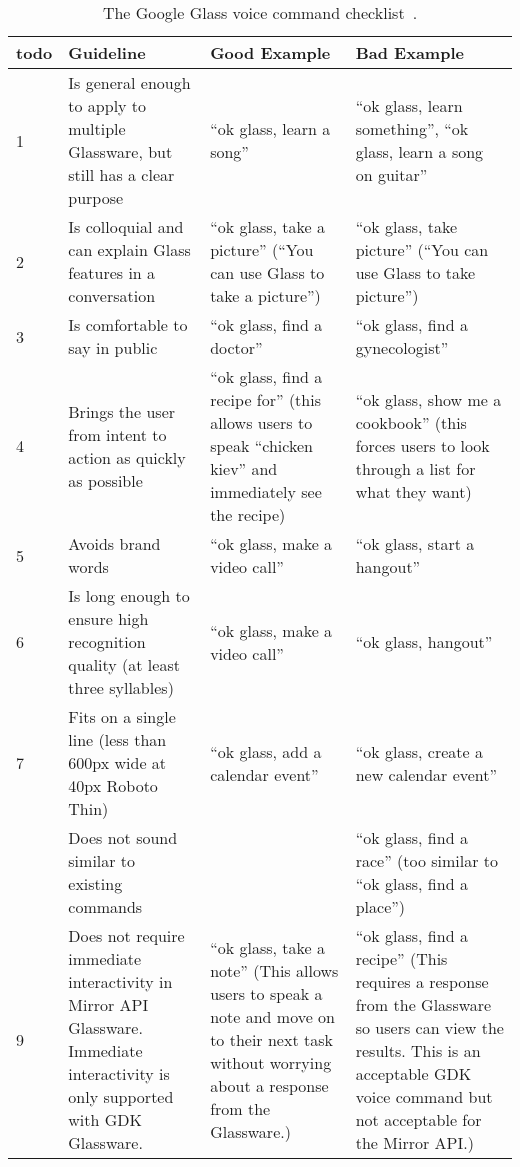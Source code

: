	\begin{table}[ht!]
    		\caption{The Google Glass voice command checklist~\cite{glassVoiceChecklist}.} \label{tab:voiceCommandCheckTableUnchecked}
		\centering \begin{tabularx}{\textwidth}{l|X|X|X} \hline
		\textbf{todo} & \textbf{Guideline} & \textbf{Good Example} & \textbf{Bad Example} \\ \hline \hline
       
1	&	Is general enough to apply to multiple Glassware, but still has a clear purpose	&	``ok glass, learn a song''	&	``ok glass, learn something'', ``ok glass, learn a song on guitar''	\\ \hline
2	&	Is colloquial and can explain Glass features in a conversation	&	``ok glass, take a picture'' (``You can use Glass to take a picture'')	&	``ok glass, take picture'' (``You can use Glass to take picture'')	\\ \hline
3	&	Is comfortable to say in public	&	``ok glass, find a doctor''	&	``ok glass, find a gynecologist''	\\ \hline
4	&	Brings the user from intent to action as quickly as possible	&	``ok glass, find a recipe for'' (this allows users to speak ``chicken kiev'' and immediately see the recipe)	&	``ok glass, show me a cookbook'' (this forces users to look through a list for what they want)	\\ \hline
5	&	Avoids brand words	&	``ok glass, make a video call''	&	``ok glass, start a hangout''	\\ \hline
6	&	Is long enough to ensure high recognition quality (at least three syllables)	&	``ok glass, make a video call''	&	``ok glass, hangout''	\\ \hline
7	&	Fits on a single line (less than 600px wide at 40px Roboto Thin)	&	``ok glass, add a calendar event''	&	``ok glass, create a new calendar event''	\\ \hline \pagebreak
8	&	Does not sound similar to existing commands	&		&	``ok glass, find a race'' (too similar to ``ok glass, find a place'')	\\ \hline
9	&	Does not require immediate interactivity in Mirror API Glassware. Immediate interactivity is only supported with GDK Glassware.	&	``ok glass, take a note'' (This allows users to speak a note and move on to their next task without worrying about a response from the Glassware.)	&	``ok glass, find a recipe'' (This requires a response from the Glassware so users can view the results. This is an acceptable GDK voice command but not acceptable for the Mirror API.)	\\ \hline

\end{tabularx}
\end{table}
